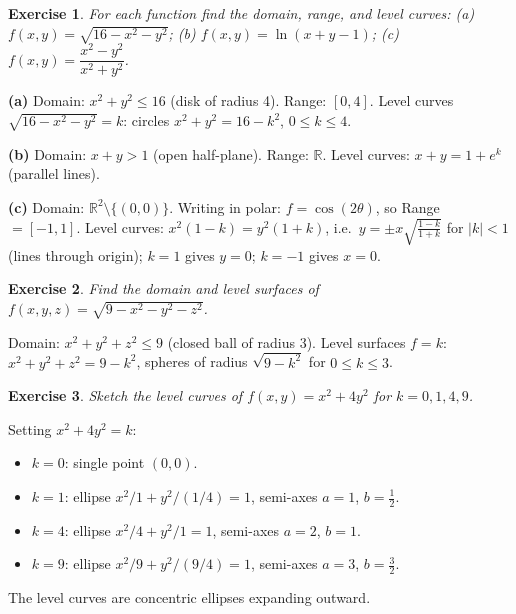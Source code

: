 \documentclass[12pt,a4paper]{article}
\theoremstyle{exstyle}
\newtheorem{exercise}{Exercise}[section]
\newcommand{\R}{\mathbb{R}}
\begin{document}
\begin{exercise}
For each function find the domain, range, and level curves:
(a) $f(x,y)=\sqrt{16-x^2-y^2}$; (b) $f(x,y)=\ln(x+y-1)$;
(c) $f(x,y)=\dfrac{x^2-y^2}{x^2+y^2}$.
\end{exercise}
\begin{solbox}
\textbf{(a)} Domain: $x^2+y^2\le 16$ (disk of radius 4). Range: $[0,4]$.
Level curves $\sqrt{16-x^2-y^2}=k$: circles $x^2+y^2=16-k^2$, $0\le k\le 4$.

\textbf{(b)} Domain: $x+y>1$ (open half-plane). Range: $\R$.
Level curves: $x+y=1+e^k$ (parallel lines).

\textbf{(c)} Domain: $\R^2\setminus\{(0,0)\}$. Writing in polar: $f=\cos(2\theta)$, so Range $=[-1,1]$.
Level curves: $x^2(1-k)=y^2(1+k)$, i.e.\ $y=\pm x\sqrt{\tfrac{1-k}{1+k}}$ for $|k|<1$ (lines through origin); $k=1$ gives $y=0$; $k=-1$ gives $x=0$.
\end{solbox}

\begin{exercise}
Find the domain and level surfaces of $f(x,y,z)=\sqrt{9-x^2-y^2-z^2}$.
\end{exercise}
\begin{solbox}
Domain: $x^2+y^2+z^2\le 9$ (closed ball of radius 3).
Level surfaces $f=k$: $x^2+y^2+z^2=9-k^2$, spheres of radius $\sqrt{9-k^2}$ for $0\le k\le 3$.
\end{solbox}

\begin{exercise}
Sketch the level curves of $f(x,y)=x^2+4y^2$ for $k=0,1,4,9$.
\end{exercise}
\begin{solbox}
Setting $x^2+4y^2=k$:
\begin{itemize}[topsep=2pt,itemsep=1pt]
  \item $k=0$: single point $(0,0)$.
  \item $k=1$: ellipse $x^2/1+y^2/(1/4)=1$, semi-axes $a=1$, $b=\tfrac{1}{2}$.
  \item $k=4$: ellipse $x^2/4+y^2/1=1$, semi-axes $a=2$, $b=1$.
  \item $k=9$: ellipse $x^2/9+y^2/(9/4)=1$, semi-axes $a=3$, $b=\tfrac{3}{2}$.
\end{itemize}
The level curves are concentric ellipses expanding outward.
\end{solbox}
\end{document}
